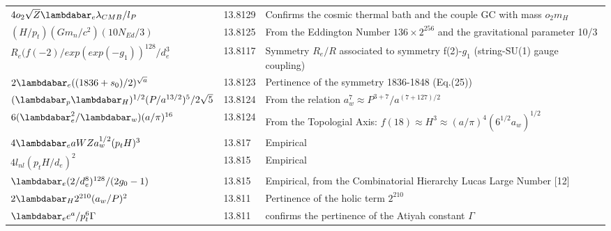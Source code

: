 \documentclass[a4paper,9pt]{article}
\begin{document}
\begin{table}
\begin{tabular}{lll}
 
 
 
 
 $4o_2\sqrt Z \lambdabar_{e}\lambda_{CMB}/l_P     $  & 13.8129    &Confirms the cosmic thermal bath and the couple GC with mass $o_2 m_H$    \\
 
 
 
 
 $ (H/p_t)(Gm_n/c^2) (10N_{Ed}/3)$ & 13.8125 & From the Eddington Number $136 \times 2^{256}$ and the gravitational parameter 10/3 \cite{Sanchez3}  \\
 
 
 $ R_e ({f(-2)}/exp(exp(-g_1))^{128}/d_e^3$  & 13.8117    & Symmetry $R_e/R$ associated to symmetry f(2)-$g_1$  (string-SU(1) gauge coupling)     \\
 
 
 
 



 $ 2\lambdabar_{e} ((1836+s_0)/2)^{\sqrt a} $  & 13.8123 & Pertinence of the symmetry 1836-1848 (Eq.(25))\\

  
  $ (\lambdabar_{p} \lambdabar_{H})^{1/2} (P/a^{13/2})^5/2\sqrt 5 $  & 13.8124 & From the relation $a_w^7 \approx P^{3+7}/a^{(7 + 127)/2}$ \cite{Sanchez3}\\
 
  
  $6(\lambdabar_{e}^2/\lambdabar_w)(a/\pi)^{16}$  & 13.8124    & From the Topologial Axis: $f(18)\approx H^3 \approx (a/\pi)^4 (6^{1/2}a_w)^{1/2}$  \\
  
  
  
   
  $4\lambdabar_e a WZ a_w^{1/2} (p_tH)^3$  & 13.817    & Empirical \\
  
  $4l_{nl} (p_tH/d_e)^2$  & 13.815    & Empirical \\
  
 $\lambdabar_e (2/d_e^8)^{128}/(2g_0-1)$  & 13.815    &  Empirical, from the Combinatorial Hierarchy Lucas Large Number [12] \\ 
  
  
  $ 2\lambdabar_{H}2^{210} (a_w/P)^2  $ & 13.811 & Pertinence of the holic term $2^{210}$ \\
  
  $ \lambdabar_e e^a/p_t^6\Gamma$ & 13.811 & confirms the pertinence of the Atiyah constant $\Gamma$  \\
  

\end{tabular}
\end{table}
\end{document}
